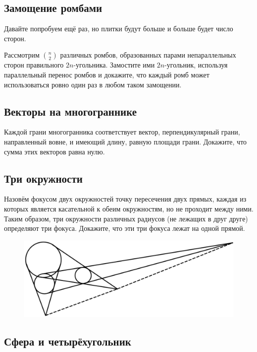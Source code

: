 \subsection*{Замощение ромбами}%

Давайте попробуем ещё раз, но плитки будут больше и больше будет число сторон.

Рассмотрим $\binom n2$ различных ромбов, образованных парами непараллельных сторон правильного $2n$-угольника.
Замостите ими $2n$-угольник, используя параллельный перенос ромбов
и докажите, что каждый ромб может использоваться ровно один раз в любом таком замощении.

\subsection*{Векторы на многограннике}%

Каждой грани многогранника соответствует вектор, перпендикулярный грани, направленный вовне, и имеющий длину, равную площади грани.
Докажите, что сумма этих векторов равна нулю.

\subsection*{Три окружности}%

Назовём фокусом двух окружностей точку пересечения двух прямых, каждая из которых является касательной к обеим окружностям, но не проходит между ними.
Таким образом, три окружности различных радиусов (не лежащих в друг друге)
определяют три фокуса.
Докажите, что эти три фокуса лежат на одной прямой.

\begin{figure}[h!]
\centering
\includegraphics[scale=0.5]{Figs/Geometry/foci}
\end{figure} 

\subsection*{Сфера и четырёхугольник}%


